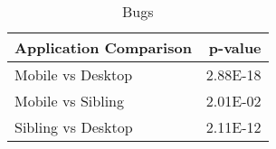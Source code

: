 \begin{table}[ht]
\centering
\caption{Bugs} 
\begin{tabular}{lr}
  \hline
Application Comparison & p-value \\ 
  \hline
Mobile vs Desktop & 2.88E-18 \\ 
  Mobile vs Sibling & 2.01E-02 \\ 
  Sibling vs Desktop & 2.11E-12 \\ 
   \hline
\end{tabular}
\end{table}

